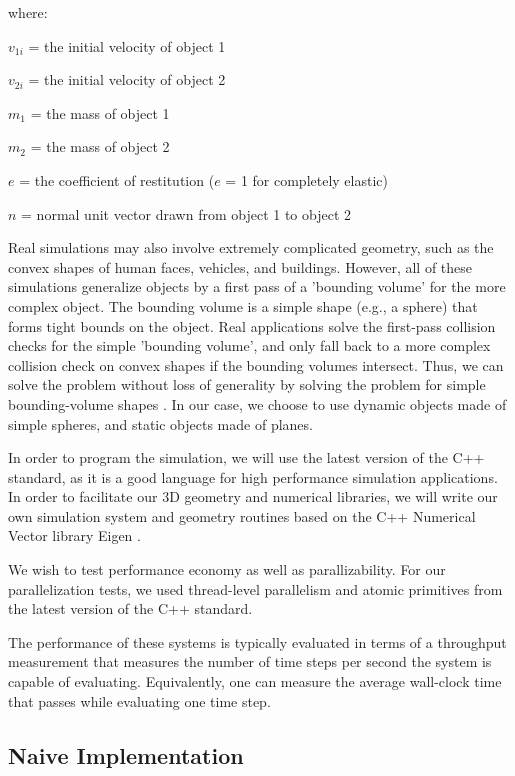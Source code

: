 \documentclass[CEJCS,PDF]{cej} %
\begin{document}
where:

$v_{1i}$ = the initial velocity of object 1

$v_{2i}$ = the initial velocity of object 2

$m_1$ = the mass of object 1

$m_2$ = the mass of object 2

$e$ = the coefficient of restitution ($e$ = 1 for completely elastic)

$n$ = normal unit vector drawn from object 1 to object 2


Real simulations may also involve extremely complicated geometry, such as the convex shapes of human faces, vehicles, and buildings.  However, 
all of these simulations generalize objects by a first pass of a 'bounding volume' for the more complex object.  The bounding volume is a simple shape (e.g., a sphere)
that forms tight bounds on the object.  Real applications solve the first-pass collision checks for the simple 'bounding volume', and only fall back to a more complex
collision check on convex shapes if the bounding volumes intersect.  Thus, we can solve the problem without loss of generality by solving the problem
for simple bounding-volume shapes \cite{uberflow,cloth}.  In our case, we choose to use dynamic objects made of simple spheres, and static objects made of planes.

In order to program the simulation, we will use the latest version of the C++ standard, as it is a good language for high performance simulation applications.  In order to facilitate our 
3D geometry and numerical libraries, we will write our own simulation system and geometry routines based on the C++ Numerical Vector library Eigen \cite{eigenweb}.  

We wish to test performance economy as well as parallizability.  For our parallelization tests, we used thread-level parallelism and atomic primitives from the latest version of the C++ standard.

The performance of these systems is typically evaluated in terms of a throughput measurement that measures the number of time steps per second the system is capable of evaluating.  Equivalently, one can measure the average wall-clock time that passes while evaluating one time step.

\subsection{Naive Implementation}
\end{document}
